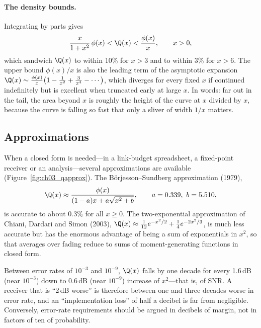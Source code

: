 \paragraph{The density bounds.} Integrating by parts gives
\begin{equation}
\frac{x}{1+x^2}\,\phi(x)<\Q(x)<\frac{\phi(x)}{x},\qquad x>0,
\label{eq:ch03:qdensitybounds}
\end{equation}
which sandwich $\Q(x)$ to within 10\% for $x>3$ and to within 3\% for $x>6$. The upper bound
$\phi(x)/x$ is also the leading term of the asymptotic expansion
$\Q(x)\sim\frac{\phi(x)}{x}\big(1-\frac1{x^2}+\frac{3}{x^4}-\cdots\big)$, which diverges for every
fixed $x$ if continued indefinitely but is excellent when truncated early at large $x$. In words:
far out in the tail, the area beyond $x$ is roughly the height of the curve at $x$ divided by $x$,
because the curve is falling so fast that only a sliver of width $1/x$ matters.


\subsection{Approximations}

When a closed form is needed---in a link-budget spreadsheet, a fixed-point receiver or an
analysis---several approximations are available (Figure~\ref{fig:ch03_qapprox}). The
B\"orjesson--Sundberg approximation (1979),
\begin{equation}
\Q(x)\approx\frac{\phi(x)}{(1-a)x+a\sqrt{x^2+b}},\qquad a=0.339,\ b=5.510,
\end{equation}
is accurate to about 0.3\% for all $x\ge0$. The two-exponential approximation of Chiani, Dardari
and Simon (2003), $\Q(x)\approx\frac1{12}e^{-x^2/2}+\frac14e^{-2x^2/3}$, is much less accurate but
has the enormous advantage of being a sum of exponentials in $x^2$, so that averages over fading
reduce to sums of moment-generating functions in closed form.

\begin{keyidea}
Between error rates of $10^{-3}$ and $10^{-9}$, $\Q(x)$ falls by one decade for every 1.6\,dB (near
$10^{-3}$) down to 0.6\,dB (near $10^{-9}$) increase of $x^2$---that is, of SNR. A receiver that is
``2\,dB worse'' is therefore between one and three decades worse in error rate, and an
``implementation loss'' of half a decibel is far from negligible. Conversely, error-rate
requirements should be argued in decibels of margin, not in factors of ten of probability.
\end{keyidea}

